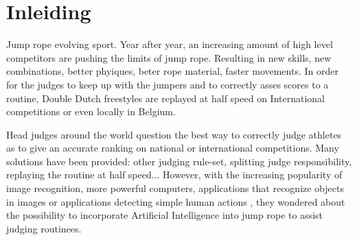 
\section{Inleiding}%
\label{sec:inleiding}

    

Jump rope evolving sport.
Year after year, an increasing amount of high level competitors are pushing the limits of jump rope.
Resulting in new skills, new combinations, better phyiques, beter rope material, faster movements.
In order for the judges to keep up with the jumpers and to correctly asses scores to a routine, Double Dutch freestyles are replayed at half speed on International competitions or even locally in Belgium.

Head judges around the world question the best way to correctly judge athletes as to give an accurate ranking on national or international competitions.
Many solutions have been provided: other judging rule-set, splitting judge responsibility, replaying the routine at half speed...
However, with the increasing popularity of image recognition, more powerful computers, applications that recognize objects in images \autocite{Singh_Gill_2022} or applications detecting simple human actions \autocite{LUQMAN_2022}, they wondered about the possibility to incorporate Artificial Intelligence into jump rope to assist judging routinees.

